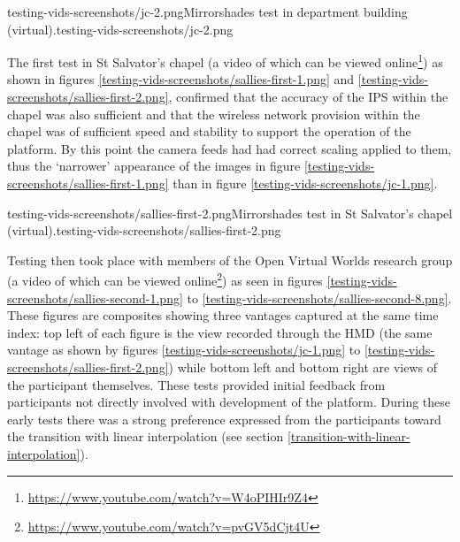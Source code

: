        {testing-vids-screenshots/jc-2.png}{Mirrorshades test in department building (virtual).}{testing-vids-screenshots/jc-2.png}


The first test in St Salvator's chapel (a video of which can be viewed online\footnote{\url{https://www.youtube.com/watch?v=W4oPIHIr9Z4}}) as shown in figures \ref{testing-vids-screenshots/sallies-first-1.png} and \ref{testing-vids-screenshots/sallies-first-2.png}, confirmed that the accuracy of the IPS within the chapel was also sufficient and that the wireless network provision within the chapel was of sufficient speed and stability to support the operation of the platform. By this point the camera feeds had had correct scaling applied to them, thus the `narrower' appearance of the images in figure \ref{testing-vids-screenshots/sallies-first-1.png} than in figure \ref{testing-vids-screenshots/jc-1.png}.

       {testing-vids-screenshots/sallies-first-2.png}{Mirrorshades test in St Salvator's chapel (virtual).}{testing-vids-screenshots/sallies-first-2.png}

\newpage

Testing then took place with members of the Open Virtual Worlds research group (a video of which can be viewed online\footnote{\url{https://www.youtube.com/watch?v=pvGV5dCjt4U}}) as seen in figures \ref{testing-vids-screenshots/sallies-second-1.png} to \ref{testing-vids-screenshots/sallies-second-8.png}. These figures are composites showing three vantages captured at the same time index: top left of each figure is the view recorded through the HMD (the same vantage as shown by figures \ref{testing-vids-screenshots/jc-1.png} to \ref{testing-vids-screenshots/sallies-first-2.png}) while bottom left and bottom right are views of the participant themselves. These tests provided initial feedback from participants not directly involved with development of the platform. During these early tests there was a strong preference expressed from the participants toward the transition with linear interpolation (see section \ref{transition-with-linear-interpolation}).

